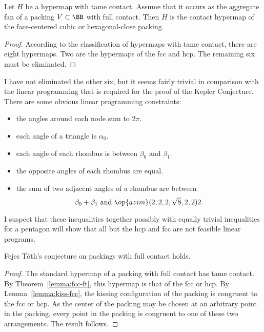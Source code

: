\begin{lemma}\label{lemma:fcc-ft} Let $H$ be a hypermap
  with tame contact.  Assume that it occurs as the aggregate fan of a
   packing $V\subset\BB$  with full contact.  Then $H$ is the contact
  hypermap of the face-centered cubic or hexagonal-close packing.
\end{lemma}

\begin{proof} According to the classification of hypermaps with tame
  contact, there are eight hypermaps.  Two are the hypermaps of the
  fcc and hcp.  The remaining six must be eliminated.
\end{proof}

\begin{note}%
  I have not eliminated the other six, but it seems fairly trivial in
  comparison with the linear programming that is required for the
  proof of the Kepler Conjecture.  There are some obvious linear
  programming constraints:
\begin{itemize}
\item the angles around each node sum to $2\pi$.
\item each angle of a triangle is $\alpha_0$.
\item each angle of each rhombus is between $\beta_0$ and $\beta_1$.
\item the opposite angles of each rhombus are equal.
\item the sum of two adjacent angles of a rhombus are between
\begin{displaymath}
\beta_0 + \beta_1 \hbox{ and } \op{azim}(2,2,2,\sqrt8,2,2)2.
\end{displaymath}
\end{itemize}
I suspect that these inequalities together possibly with equally
trivial inequalities for a pentagon will show that all but the hcp and
fcc are not feasible linear programs.
\end{note}

\begin{theorem}  
Fejes T\'oth's conjecture on packings with full contact holds.
\end{theorem}
%

\begin{proof} The standard hypermap of a  packing with full
  contact has tame contact.  By Theorem~\ref{lemma:fcc-ft}, this
  hypermap is that of the fcc or hcp.  By Lemma~\ref{lemma:kiss-fcc},
  the kissing configuration of the  packing is congruent to
  the fcc or hcp.  As the center of the packing may be chosen at an
  arbitrary point in the packing, every point in the packing is
  congruent to one of these two arrangements.  The result follows.
\end{proof}
%
%

